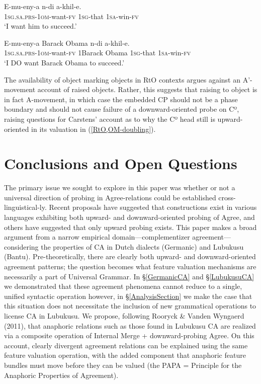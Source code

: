\documentclass[output=paper
,modfonts
,nonflat
]{langsci/langscibook}
\begin{document}
\begin{xlist}

\ex \label{OMedRtOObject}
\gll E-mu-eny-a n-di a-khil-e. \\
1\textsc{sg}.\textsc{sa}.\textsc{prs}-1\textsc{om}-want-\textsc{fv} 1\textsc{sg}-that 1\textsc{sa}-win-\textsc{fv}\\
\glt `I want him to succeed.'

\ex \label{RtO,OM-doubling}
\gll E-mu-eny-a Barack Obama n-di a-khil-e.\\
1\textsc{sg}.\textsc{sa}.\textsc{prs}-1\textsc{om}-want-\textsc{fv} 1Barack Obama 1\textsc{sg}-that 1\textsc{sa}-win-\textsc{fv} \\
\glt `I DO want Barack Obama to succeed.'

\end{xlist}
\z
\noindent The availability of object marking objects in RtO contexts argues against an A’-movement account of raised objects. Rather, this suggests that raising to object is in fact A-movement, in which case the embedded CP should not be a phase boundary and should not cause failure of a downward-oriented probe on Cº, raising questions for Carstens’ account as to why the Cº head still is upward-oriented in its valuation in (\ref{RtO,OM-doubling}).

\section{Conclusions and Open Questions}

The primary issue we sought to explore in this paper was whether or not a universal direction of probing in Agree-relations could be established cross-linguistical-\newline ly. Recent proposals have suggested that constructions exist in various languages exhibiting both upward- and downward-oriented probing of Agree, and others have suggested that only upward probing exists. This paper makes a broad argument from a narrow empirical domain—complementizer agreement—considering the properties of CA in Dutch dialects (Germanic) and Lubukusu (Bantu). Pre-theoretically, there are clearly both upward- and downward-oriented agreement patterns; the question becomes what feature valuation mechanisms are necessarily a part of Universal Grammar. In \S \ref{GermanicCA} and \S \ref{LubukusuCA} we demonstrated that these agreement phenomena cannot reduce to a single, unified syntactic operation  however, in \S \ref{AnalysisSection} we make the case that this situation does not necessitate the inclusion of new grammatical operations to license CA in Lubukusu. We propose, following Rooryck \& Vanden Wyngaerd (2011), that anaphoric relations such as those found in Lubukusu CA are realized via a composite operation of Internal Merge + downward-probing Agree. On this account, clearly divergent agreement relations can be explained using the same feature valuation operation, with the added component that anaphoric feature bundles must move before they can be valued (the PAPA = Principle for the Anaphoric Properties of Agreement). 
\end{document}
